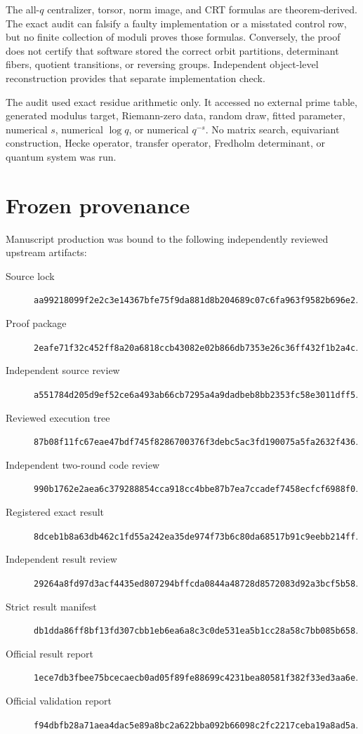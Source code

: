 \documentclass[11pt]{article}
\theoremstyle{definition}
\theoremstyle{remark}
\begin{document}
The all-\(q\) centralizer, torsor, norm image, and CRT formulas are
theorem-derived.  The exact audit can falsify a faulty implementation or a
misstated control row, but no finite collection of moduli proves those
formulas.  Conversely, the proof does not certify that software stored the
correct orbit partitions, determinant fibers, quotient transitions, or
reversing groups.  Independent object-level reconstruction provides that
separate implementation check.

The audit used exact residue arithmetic only.  It accessed no external prime
table, generated modulus target, Riemann-zero data, random draw, fitted
parameter, numerical \(s\), numerical \(\log q\), or numerical
\(q^{-s}\).  No matrix search, equivariant construction, Hecke operator,
transfer operator, Fredholm determinant, or quantum system was run.

\section{Frozen provenance}
\label{app:provenance}

Manuscript production was bound to the following independently reviewed
upstream artifacts:
\begin{description}
  \item[Source lock]
  \nolinkurl{aa99218099f2e2c3e14367bfe75f9da881d8b204689c07c6fa963f9582b696e2}.
  \item[Proof package]
  \nolinkurl{2eafe71f32c452ff8a20a6818ccb43082e02b866db7353e26c36ff432f1b2a4c}.
  \item[Independent source review]
  \nolinkurl{a551784d205d9ef52ce6a493ab66cb7295a4a9dadbeb8bb2353fc58e3011dff5}.
  \item[Reviewed execution tree]
  \nolinkurl{87b08f11fc67eae47bdf745f8286700376f3debc5ac3fd190075a5fa2632f436}.
  \item[Independent two-round code review]
  \nolinkurl{990b1762e2aea6c379288854cca918cc4bbe87b7ea7ccadef7458ecfcf6988f0}.
  \item[Registered exact result]
  \nolinkurl{8dceb1b8a63db462c1fd55a242ea35de974f73b6c80da68517b91c9eebb214ff}.
  \item[Independent result review]
  \nolinkurl{29264a8fd97d3acf4435ed807294bffcda0844a48728d8572083d92a3bcf5b58}.
  \item[Strict result manifest]
  \nolinkurl{db1dda86ff8bf13fd307cbb1eb6ea6a8c3c0de531ea5b1cc28a58c7bb085b658}.
  \item[Official result report]
  \nolinkurl{1ece7db3fbee75bcecaecb0ad05f89fe88699c4231bea80581f382f33ed3aa6e}.
  \item[Official validation report]
  \nolinkurl{f94dbfb28a71aea4dac5e89a8bc2a622bba092b66098c2fc2217ceba19a8ad5a}.
\end{description}
\end{document}
